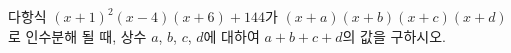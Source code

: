 다항식 $(x+1)^2(x-4)(x+6)+144$가 $(x+a)(x+b)(x+c)(x+d)$로 인수분해 될 때, 상수 $a$, $b$, $c$, $d$에 대하여 $a+b+c+d$의 값을 구하시오.
